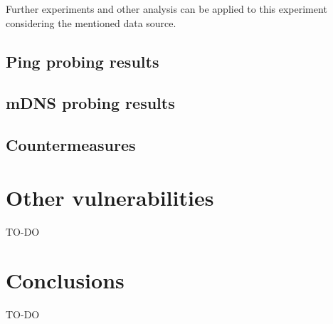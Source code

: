 \documentclass[fleqn, 11pt]{SelfArx} %
\begin{document}
Further experiments and other analysis can be applied to this experiment considering the mentioned data source.
\subsection{Ping probing results}
\subsection{mDNS probing results}
\subsection{Countermeasures} %


\section{Other vulnerabilities}
TO-DO


\section{Conclusions}
TO-DO




\nocite{*}

\end{document}
